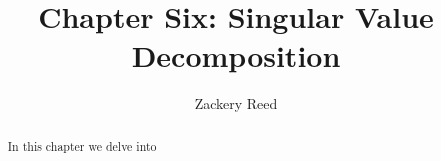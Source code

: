 \documentclass{xourse}
\title{Chapter Six: Singular Value Decomposition}
\author{Zackery Reed}
\begin{document}
\begin{abstract}
    In this chapter we delve into 
\end{abstract}
\maketitle

\sectionstyle
\end{document}
